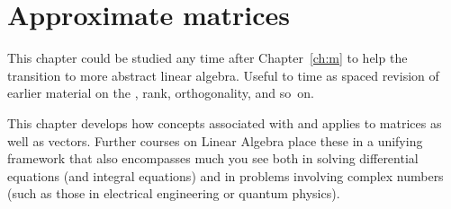 
\chapter{Approximate matrices}
\label{ch:am}
\minitoc


\begin{aside}
This chapter could be studied any time after Chapter~\ref{ch:m} to help the transition to more abstract linear algebra.  
Useful to time as spaced revision of earlier material on the \svd, rank, orthogonality, and so~on.
\end{aside}

This chapter develops how concepts associated with  and  applies to matrices as well as vectors.  
Further courses on Linear Algebra place these in a unifying framework that also encompasses much you see both in solving differential equations (and integral equations) and in problems involving complex numbers (such as those in electrical engineering or quantum physics). 



\begin{comment} 
Huge applications of \svd{}s to video compression, experimental errors, and other areas.
Introduce digital \idx{image compression} by \svd{}s \pooliv{p.607--8} \holti{p.336--7}  \cite[\S07]{Davis99a}.
\cite{Higham86} mentions applications of \idx{polar decomposition} to the Orthogonal Procrustes problem.
\end{comment}







\endinput

